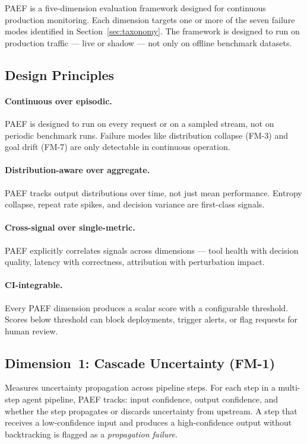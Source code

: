 \documentclass{article}
\begin{document}
PAEF is a five-dimension evaluation framework designed for continuous
production monitoring.  Each dimension targets one or more of the seven failure
modes identified in Section~\ref{sec:taxonomy}.  The framework is designed to
run on production traffic --- live or shadow --- not only on offline benchmark
datasets.

\subsection{Design Principles}

\paragraph{Continuous over episodic.}
PAEF is designed to run on every request or on a sampled stream, not on
periodic benchmark runs.  Failure modes like distribution collapse (FM-3) and
goal drift (FM-7) are only detectable in continuous operation.

\paragraph{Distribution-aware over aggregate.}
PAEF tracks output distributions over time, not just mean performance.  Entropy
collapse, repeat rate spikes, and decision variance are first-class signals.

\paragraph{Cross-signal over single-metric.}
PAEF explicitly correlates signals across dimensions --- tool health with
decision quality, latency with correctness, attribution with perturbation
impact.

\paragraph{CI-integrable.}
Every PAEF dimension produces a scalar score with a configurable threshold.
Scores below threshold can block deployments, trigger alerts, or flag requests
for human review.

\subsection{Dimension~1: Cascade Uncertainty (FM-1)}

Measures uncertainty propagation across pipeline steps.  For each step in a
multi-step agent pipeline, PAEF tracks: input confidence, output confidence,
and whether the step propagates or discards uncertainty from upstream.  A step
that receives a low-confidence input and produces a high-confidence output
without backtracking is flagged as a \emph{propagation failure}.
\end{document}
